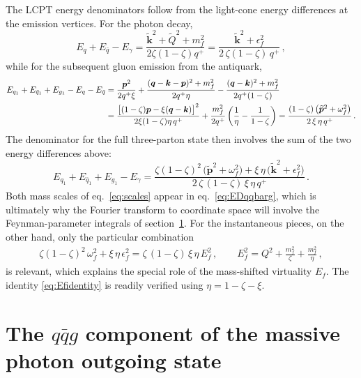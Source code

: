 \documentclass[11pt,a4paper]{article}
\newcommand{\vk}{\bm{k}}
\newcommand{\vp}{\bm{p}}
\newcommand{\vq}{\bm{q}}
\newcommand{\kt}{\widetilde{\bm{k}}}
\newcommand{\pt}{\widetilde{\bm{p}}}
\newcommand{\eps}{\epsilon}
\numberwithin{equation}{section}
\begin{document}
The LCPT energy denominators follow from the light-cone energy differences at the emission
vertices. For the photon decay,
\begin{equation}
\label{eq:EDqqbar}
E_{q}+E_{\bar{q}}-E_{\gamma} = \frac{\kt^{2}+\widetilde Q^{2}+m^{2}_{f}}{2\zeta(1-\zeta)q^{+}}
= \frac{\kt^{2}+\eps^{2}_{f}}{2\,\zeta(1-\zeta)\,q^{+}}\,,
\end{equation}
while for the subsequent gluon emission from the antiquark,
\begin{align}
\label{eq:EDemission}
E_{q_{1}}+E_{\bar{q}_{1}}+E_{g_{1}}-E_{q}-E_{\bar{q}} & =
\frac{\vp^{2}}{2q^{+}\xi}+\frac{(\vq-\vk-\vp)^{2}+m^{2}_{f}}{2q^{+}\eta}
-\frac{(\vq-\vk)^{2}+m^{2}_{f}}{2q^{+}(1-\zeta)} \notag\\
& = \frac{\big[(1-\zeta)\vp - \xi(\vq-\vk)\big]^{2}}{2\xi(1-\zeta)\eta\, q^{+}}
+\frac{m^{2}_{f}}{2q^{+}}\left(\frac{1}{\eta} - \frac{1}{1-\zeta}\right)
= \frac{(1-\zeta)\,\big(\pt^{2}+\omega^{2}_{f}\big)}{2\,\xi\,\eta\,q^{+}}\,.
\end{align}
The denominator for the full three-parton state then involves the sum of the two energy
differences above:
\begin{equation}
\label{eq:EDqqbarg}
E_{q_{1}}+E_{\bar{q}_{1}}+E_{g_{1}}-E_{\gamma} =
\frac{\zeta(1-\zeta)^{2}\, \big(\pt^{2}+\omega^{2}_{f}\big)
+ \xi\,\eta\, \big(\kt^{2}+\eps^{2}_{f}\big)}{2\,\zeta\,(1-\zeta)\,\xi\,\eta\,q^{+}}\,.
\end{equation}
Both mass scales of eq.~\eqref{eq:scales} appear in eq.~\eqref{eq:EDqqbarg}, which is
ultimately why the Fourier transform to coordinate space will involve the Feynman-parameter
integrals of section~\ref{sec:wf}. For the instantaneous pieces, on the other hand, only the
particular combination
\begin{align}
\label{eq:Efidentity}
\zeta(1-\zeta)^{2}\,\omega^{2}_{f} + \xi\,\eta\,\eps^{2}_{f} =
\zeta\,(1-\zeta)\,\xi\,\eta\,E^{2}_{f}\,,\qquad
E^{2}_{f} = Q^{2} + \frac{m^{2}_{f}}{\zeta} + \frac{m^{2}_{f}}{\eta}\,,
\end{align}
is relevant, which explains the special role of the mass-shifted virtuality $E_f$. The identity
\eqref{eq:Efidentity} is readily verified using $\eta=1-\zeta-\xi$.

\section{The \texorpdfstring{$q\bar qg$}{qqbarg} component of the massive photon outgoing state}
\label{sec:wf}
\end{document}
